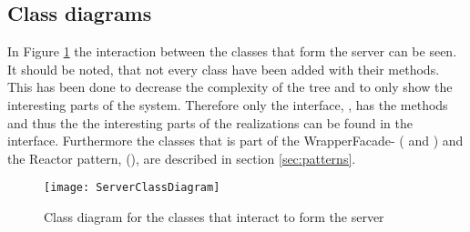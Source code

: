 \documentclass[Main]{subfiles}
\begin{document}
\subsection{Class diagrams}
In Figure \ref{fig:wrapperfacadeuml} the interaction between the classes that form the server can be seen. 
It should be noted, that not every class have been added with their methods. 
This has been done to decrease the complexity of the tree and to only show the interesting parts of the system.
Therefore only the interface, , has the methods and thus the the interesting parts of the realizations can be found in the interface.
Furthermore the classes that is part of the WrapperFacade- ( and ) and the Reactor pattern, (), are described in section \ref{sec:patterns}.

\begin{figure}[hbtp]
\centering
\texttt{[image: ServerClassDiagram]}
\caption{Class diagram for the classes that interact to form the server}
\label{fig:wrapperfacadeuml}
\end{figure}
\end{document}
